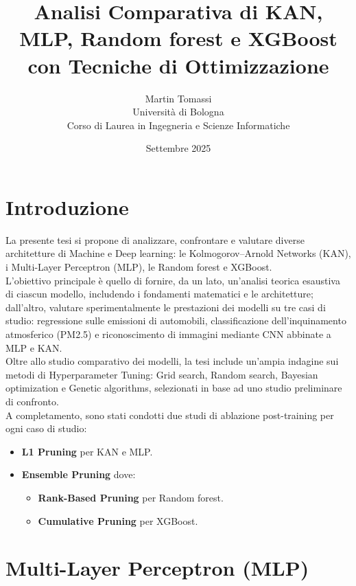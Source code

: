 \documentclass[a4paper,12pt]{report}
\title{Analisi Comparativa di KAN, MLP, Random forest e XGBoost con Tecniche di Ottimizzazione}
\author{Martin Tomassi \\ Università di Bologna \\ Corso di Laurea in Ingegneria e Scienze Informatiche}
\date{Settembre 2025}
\begin{document}
	
	\maketitle
	
	\tableofcontents
	
	\chapter*{Introduzione}
	La presente tesi si propone di analizzare, confrontare e valutare diverse architetture di Machine e Deep learning: le Kolmogorov–Arnold Networks (KAN), i Multi-Layer Perceptron (MLP), le Random forest e XGBoost. \\
	L’obiettivo principale è quello di fornire, da un lato, un’analisi teorica esaustiva di ciascun modello, includendo i fondamenti matematici e le architetture; dall’altro, valutare sperimentalmente le prestazioni dei modelli su tre casi di studio: regressione sulle emissioni di automobili, classificazione dell’inquinamento atmosferico (PM2.5) e riconoscimento di immagini mediante CNN abbinate a MLP e KAN. \\
	Oltre allo studio comparativo dei modelli, la tesi include un’ampia indagine sui metodi di Hyperparameter Tuning: Grid search, Random search, Bayesian optimization e Genetic algorithms, selezionati in base ad uno studio preliminare di confronto. \\
	A completamento, sono stati condotti due studi di ablazione post-training per ogni caso di studio:
	\begin{itemize}
		\item \textbf{L1 Pruning} per KAN e MLP.
		\item \textbf{Ensemble Pruning} dove:
		\begin{itemize}
			\item \textbf{Rank-Based Pruning} per Random forest.
			\item \textbf{Cumulative Pruning} per XGBoost.
		\end{itemize}
	\end{itemize}
	
	\chapter{Multi-Layer Perceptron (MLP)}
	
\end{document}
